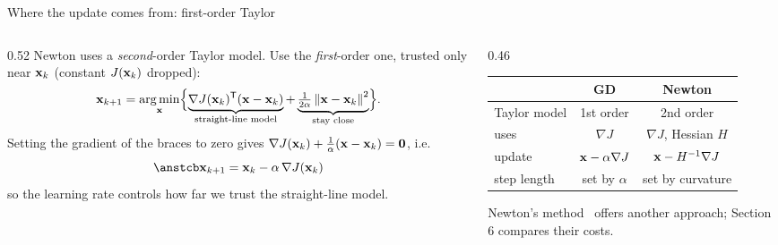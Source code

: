 \begin{frame}{Where the update comes from: first-order Taylor}
  \begin{columns}[T]
    \begin{column}{0.52\textwidth}
      \small
      Newton uses a \emph{second}-order Taylor model. Use the \emph{first}-order one, trusted only near $\mathbf{x}_k$
      (constant $J(\mathbf{x}_k)$ dropped):
      \[
        \mathbf{x}_{k+1} = \operatorname*{arg\,min}_{\mathbf{x}}\Bigl\{\underbrace{\nabla J(\mathbf{x}_k)^{\mathsf T}(\mathbf{x} - \mathbf{x}_k)}_{\text{straight-line model}}
          + \underbrace{\tfrac{1}{2\alpha}\left\lVert \mathbf{x} - \mathbf{x}_k \right\rVert^2}_{\text{stay close}}\Bigr\}.
      \]
      Setting the gradient of the braces to zero gives
      $\nabla J(\mathbf{x}_k) + \tfrac1\alpha(\mathbf{x} - \mathbf{x}_k) = \mathbf 0$, i.e.
      \[
        \ans{\x_{k+1} = \x_k - \alpha\,\nabla J(\x_k)}
      \]
      so the learning rate controls \alert{how far we trust the straight-line model}.
    \end{column}
    \begin{column}{0.46\textwidth}
      \centering
      \footnotesize
      \begin{tabular}{@{}l c c@{}}
        \toprule
        & GD & Newton \\
        \midrule
        Taylor model & 1st order & 2nd order \\
        uses & $\nabla J$ & $\nabla J$, Hessian $H$ \\
        update & $\mathbf{x} - \alpha\nabla J$ & $\mathbf{x} - H^{-1}\nabla J$ \\
        step length & set by $\alpha$ & set by curvature \\
        \bottomrule
      \end{tabular}

      \vspace{6pt}
      \raggedright\footnotesize Newton's method~\cite{chapra} offers another approach; Section 6 compares their costs.
    \end{column}
  \end{columns}
\end{frame}

